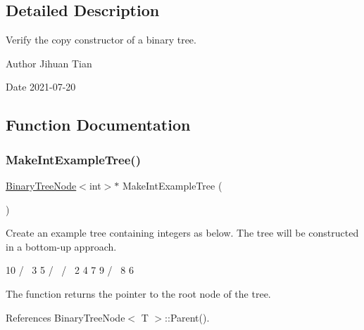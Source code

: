 \subsection{Detailed Description}
Verify the copy constructor of a binary tree. 

\begin{DoxyAuthor}{Author}
Jihuan Tian 
\end{DoxyAuthor}
\begin{DoxyDate}{Date}
2021-\/07-\/20 
\end{DoxyDate}


\subsection{Function Documentation}
\mbox{\label{binary-tree-copy_8cc_ac883754e3b5ec7169c6d767f15641276}} 
\subsubsection{\texorpdfstring{Make\+Int\+Example\+Tree()}{MakeIntExampleTree()}}
{\footnotesize\ttfamily \hyperlink{classBinaryTreeNode}{Binary\+Tree\+Node}$<$int$>$$\ast$ Make\+Int\+Example\+Tree (\begin{DoxyParamCaption}{ }\end{DoxyParamCaption})}

Create an example tree containing integers as below. The tree will be constructed in a bottom-\/up approach. \begin{DoxyVerb}     10
    /  \
  3      5
 / \    / \
2   4  7   9
   / \
  8   6
\end{DoxyVerb}


The function returns the pointer to the root node of the tree. 

References Binary\+Tree\+Node$<$ T $>$\+::\+Parent().

